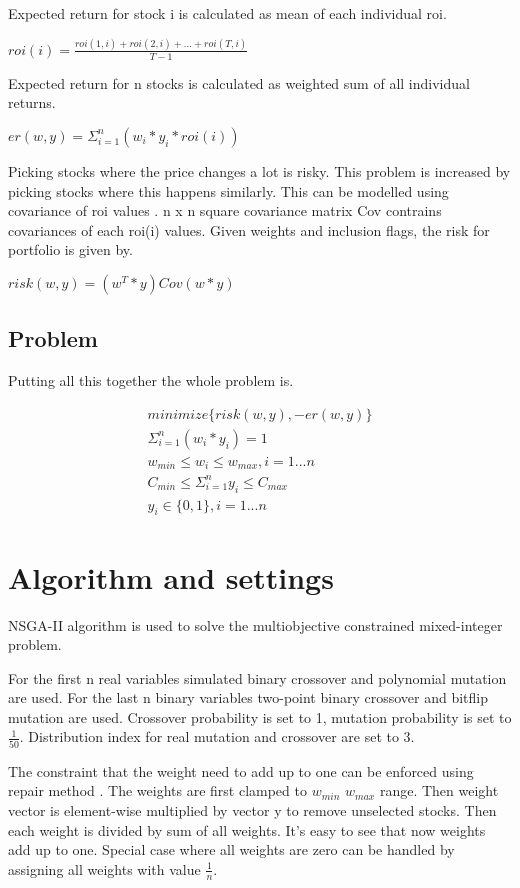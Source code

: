\documentclass[11pt]{article} %
\begin{document}
Expected return for stock i is calculated as mean of each individual roi.

$roi(i) = \frac{roi(1, i) + roi(2, i) + ... + roi(T, i)}{T-1}$

Expected return for n stocks is calculated as weighted sum of all individual returns.

$er(w,y) = \Sigma_{i=1}^{n} (w_i * y_i * roi(i))$

Picking stocks where the price changes a lot is risky. This problem is increased by picking stocks where this happens similarly. This can be modelled using covariance of roi values \cite{kolm201460}. n x n square covariance matrix Cov contrains covariances of each roi(i) values. Given weights and inclusion flags, the risk for portfolio is given by.

$risk(w,y) = (w^T * y) Cov (w * y)$

\subsection{Problem}

Putting all this together the whole problem is.

\begin{equation}
\begin{split}
minimize \{ risk(w,y), -er(w,y) \}\\
\Sigma_{i=1}^n (w_i * y_i) = 1\\
w_{min} \leq w_i \leq w_{max}, i = 1...n\\
C_{min} \leq \Sigma_{i=1}^n y_i \leq C_{max}\\
y_i \in \{0,1\}, i = 1...n\
\end{split}
\end{equation}


\section{Algorithm and settings}

NSGA-II algorithm is used to solve the multiobjective constrained mixed-integer problem. 

For the first n real variables simulated binary crossover and polynomial mutation are used. For the last n binary variables two-point binary crossover and bitflip mutation are used. Crossover probability is set to 1, mutation probability is set to $\frac{1}{50}$. Distribution index for real mutation and crossover are set to 3. 

The constraint that the weight need to add up to one can be enforced using repair method \cite{kaucic2019portfolio}. The weights are first clamped to $w_{min}$ $w_{max}$ range. Then weight vector is element-wise multiplied by vector y to remove unselected stocks. Then each weight is divided by sum of all weights. It's easy to see that now weights add up to one. Special case where all weights are zero can be handled by assigning all weights with value $\frac{1}{n}$.
\end{document}
